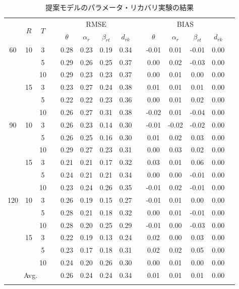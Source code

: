 \documentclass[a4paper,11pt,oneside,openany]{jsbook}
\newcommand{\bhline}[1]{\noalign{\hrule height #1}}
\begin{document}
\begin{table}[tb]
\begin{center}
\caption{提案モデルのパラメータ・リカバリ実験の結果}
\setlength{\tabcolsep}{5.pt}
\begin{tabular}{cccccccccccccc}  
\bhline{1pt}
\multirow{2}{*}{$J$} & \multirow{2}{*}{$R$} & \multirow{2}{*}{$T$}  && \multicolumn{4}{c}{RMSE} &&   \multicolumn{4}{c}{BIAS}  \\
\cline{5-8}\cline{10-13}
  & & & & $\theta$ & $\alpha_r$ & $\beta_{rt}$ & $d_{rk}$ &  & $\theta$ & $\alpha_r$ & $\beta_{rt}$ & $d_{rk}$ \\
\bhline{1pt}
60 & 10 & 3  && 0.28 & 0.23 & 0.19 & 0.34 && -0.01 & 0.01 & -0.01 & 0.00 \\
   &    & 5  && 0.29 & 0.26 & 0.25 & 0.37 && 0.00  & 0.02 & -0.03 & 0.00 \\
   &    & 10 && 0.29 & 0.23 & 0.23 & 0.37 && 0.00  & 0.01 & 0.00  & 0.00 \\
\cline{2-14}
   & 15 & 3  && 0.23 & 0.27 & 0.24 & 0.38 && 0.01  & 0.01 & 0.01  & 0.00 \\
   &    & 5  && 0.22 & 0.22 & 0.23 & 0.36 && 0.00  & 0.01 & 0.02  & 0.00 \\
   &    & 10 && 0.26 & 0.27 & 0.31 & 0.38 && -0.02 & 0.01 & -0.04 & 0.00 \\
\hline
90 & 10 & 3  && 0.26 & 0.23 & 0.14 & 0.30 && -0.01 & -0.02 & -0.02 & 0.00 \\
   &    & 5  && 0.26 & 0.25 & 0.16 & 0.30 && 0.01  & 0.02  & 0.03  & 0.00 \\
   &    & 10 && 0.29 & 0.27 & 0.23 & 0.31 && 0.00  & 0.03  & 0.02  & 0.00 \\
\cline{2-14}
& 15 & 3  && 0.21 & 0.21 & 0.17 & 0.32 && 0.03  & 0.01 & 0.06  & 0.00 \\
&    & 5  && 0.24 & 0.21 & 0.21 & 0.34 && 0.00  & 0.00 & -0.01 & 0.00\\
&    & 10 && 0.23 & 0.24 & 0.26 & 0.35 && -0.01 & 0.02 & -0.01 & 0.00\\
\hline
120 & 10 & 3  && 0.26 & 0.19 & 0.15 & 0.27 && -0.01 & 0.01 & 0.00  & 0.00 \\
    &    & 5  && 0.28 & 0.21 & 0.18 & 0.32 && 0.00  & 0.01 & -0.01 & 0.00 \\
    &    & 10 && 0.28 & 0.20 & 0.25 & 0.29 && -0.01 & 0.00 & -0.03 & 0.00\\
\cline{2-14}
& 15 & 3  && 0.22 & 0.19 & 0.13 & 0.24 && 0.02 & 0.00 & 0.03 & 0.00 \\
&    & 5  && 0.23 & 0.17 & 0.18 & 0.31 && 0.02 & 0.02 & 0.05 & 0.00 \\
&    & 10 && 0.24 & 0.20 & 0.26 & 0.30 && 0.00 & 0.01 & 0.00 & 0.00 \\
\hline
\multicolumn{4}{c}{Avg.}   &  0.26 & 0.24 & 0.24 & 0.34 &  & 0.01 & 0.01 & 0.01 & 0.00 & \\
\bhline{1pt}
\end{tabular}
\label{parameters_recovery1}
\end{center}
\end{table}
\end{document}
